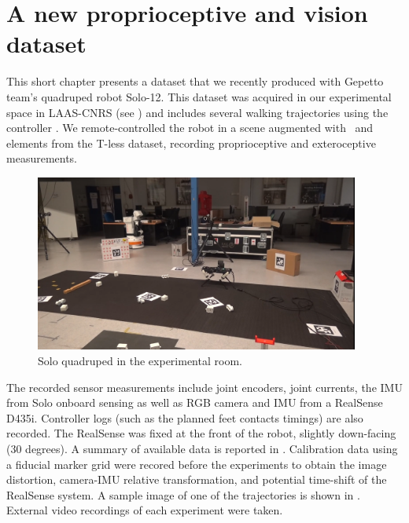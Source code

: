 \chapter{A new proprioceptive and vision dataset}
\label{chp:dataset}

This short chapter presents a dataset that we recently produced with Gepetto team's quadruped robot Solo-12. This dataset was acquired in our experimental space 
in LAAS-CNRS (see ) and includes several walking trajectories using the controller \cite{leziart2021implementation}. We remote-controlled the robot in a scene augmented 
with \apriltags\ and elements from the T-less dataset, recording proprioceptive and exteroceptive measurements. 

\begin{figure}[h]
    \centering
    \includegraphics[width=0.95\textwidth]{figures/solo_dataset_scene.png}
    \caption{Solo quadruped in the experimental room.}
    \label{fig:solo_dataset_scene}
\end{figure}

The recorded sensor measurements include joint encoders, joint currents, the IMU from Solo onboard sensing as well as RGB camera and IMU from a RealSense D435i.
Controller logs (such as the planned feet contacts timings) are also recorded. The RealSense was fixed at the front of the robot, slightly down-facing (30 degrees).
A summary of available data is reported in . Calibration data using a fiducial marker grid were recored before the experiments to 
obtain the image distortion, camera-IMU relative transformation, and potential time-shift of the RealSense system. A sample image of one of the trajectories
is shown in .
External video recordings of each experiment were taken.

